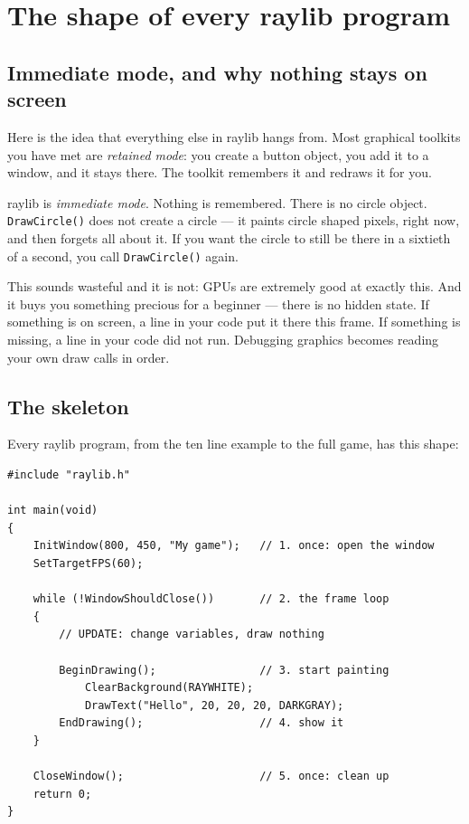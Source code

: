 \chapter{The shape of every raylib program}

\section{Immediate mode, and why nothing stays on screen}

Here is the idea that everything else in raylib hangs from. Most graphical
toolkits you have met are \emph{retained mode}: you create a button object, you
add it to a window, and it stays there. The toolkit remembers it and redraws it
for you.

raylib is \emph{immediate mode}. Nothing is remembered. There is no circle
object. \lstinline|DrawCircle()| does not create a circle --- it paints circle
shaped pixels, right now, and then forgets all about it. If you want the circle
to still be there in a sixtieth of a second, you call \lstinline|DrawCircle()|
again.


This sounds wasteful and it is not: GPUs are extremely good at exactly this. And
it buys you something precious for a beginner --- there is no hidden state. If
something is on screen, a line in your code put it there this frame. If something
is missing, a line in your code did not run. Debugging graphics becomes reading
your own draw calls in order.

\section{The skeleton}

Every raylib program, from the ten line example to the full game, has this shape:

\begin{lstlisting}
#include "raylib.h"

int main(void)
{
    InitWindow(800, 450, "My game");   // 1. once: open the window
    SetTargetFPS(60);

    while (!WindowShouldClose())       // 2. the frame loop
    {
        // UPDATE: change variables, draw nothing

        BeginDrawing();                // 3. start painting
            ClearBackground(RAYWHITE);
            DrawText("Hello", 20, 20, 20, DARKGRAY);
        EndDrawing();                  // 4. show it
    }

    CloseWindow();                     // 5. once: clean up
    return 0;
}
\end{lstlisting}

